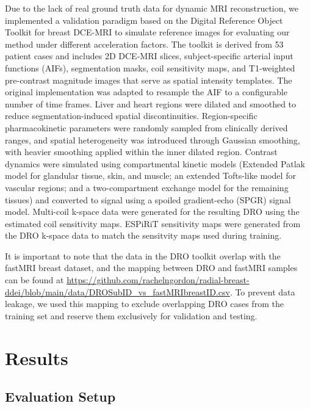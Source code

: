 \documentclass[runningheads]{llncs}
\begin{document}
Due to the lack of real ground truth data for dynamic MRI reconstruction, we implemented a validation paradigm based on the Digital Reference Object Toolkit for breast DCE-MRI \cite{Bae2024Digital} to simulate reference images for evaluating our method under different acceleration factors. The toolkit is derived from 53 patient cases and includes 2D DCE-MRI slices, subject-specific arterial input functions (AIFs), segmentation masks, coil sensitivity maps, and T1-weighted pre-contrast magnitude images that serve as spatial intensity templates. The original implementation was adapted to resample the AIF to a configurable number of time frames. Liver and heart regions were dilated and smoothed to reduce segmentation-induced spatial discontinuities. Region-specific pharmacokinetic parameters were randomly sampled from clinically derived ranges, and spatial heterogeneity was introduced through Gaussian smoothing, with heavier smoothing applied within the inner dilated region. Contrast dynamics were simulated using compartmental kinetic models (Extended Patlak model for glandular tissue, skin, and muscle; an extended Tofts-like model for vascular regions; and a two-compartment exchange model for the remaining tissues) and converted to signal using a spoiled gradient-echo (SPGR) signal model. Multi-coil k-space data were generated for the resulting DRO using the estimated coil sensitivity maps. ESPiRiT sensitivity maps were generated from the DRO k-space data to match the sensitvity maps used during training.

It is important to note that the data in the DRO toolkit overlap with the fastMRI breast dataset, and the mapping between DRO and fastMRI samples can be found at \url{https://github.com/rachelngordon/radial-breast-ddei/blob/main/data/DROSubID_vs_fastMRIbreastID.csv}. To prevent data leakage, we used this mapping to exclude overlapping DRO cases from the training set and reserve them exclusively for validation and testing.


\section{Results}


\subsection{Evaluation Setup}
\end{document}
